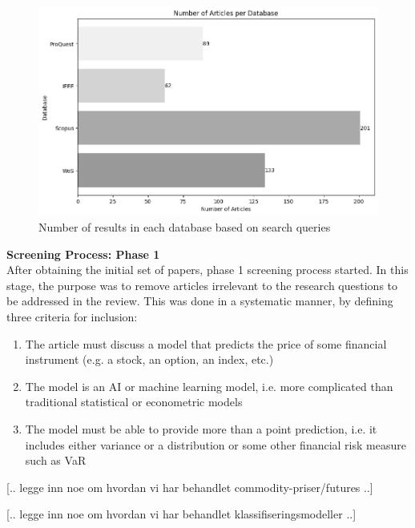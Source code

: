 \begin{figure}[H]
    \centering
    \includegraphics[width=1\linewidth]{Images/search_sample_by_database.png}
    \caption{Number of results in each database based on search queries}
    \label{fig:search_sample_by_database}
\end{figure}



\textbf{Screening Process: Phase 1} \\
After obtaining the initial set of papers, phase 1 screening process started. In this stage, the purpose was to remove articles irrelevant to the research questions to be addressed in the review. This was done in a systematic manner, by defining three criteria for inclusion:

\begin{enumerate}
    \item The article must discuss a model that predicts the price of some financial instrument (e.g. a stock, an option, an index, etc.)

    \item The model is an AI or machine learning model, i.e. more complicated than traditional statistical or econometric models

    \item The model must be able to provide more than a point prediction, i.e. it includes either variance or a distribution or some other financial risk measure such as VaR
\end{enumerate}

[.. legge inn noe om hvordan vi har behandlet commodity-priser/futures ..]

[.. legge inn noe om hvordan vi har behandlet klassifiseringsmodeller ..]

